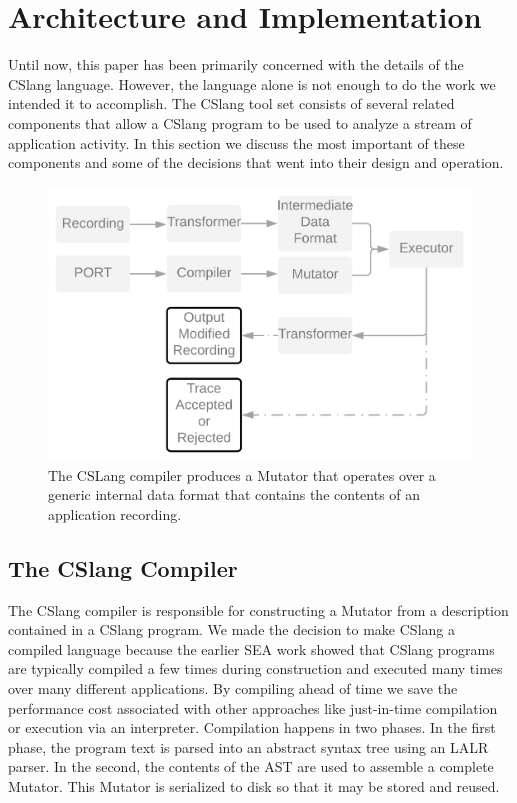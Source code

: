 \section{Architecture and Implementation}

Until now, this paper has been primarily concerned with the details of the
CSlang language.  However, the language alone is not enough to do the work
we intended it to accomplish.  The CSlang tool set
consists of several related
components that allow a CSlang program to be used to analyze a stream of
application activity.
In this section we discuss the most important of these components and some
of the decisions that went into their design and operation.

\label{SEC:architecture}

\begin{figure}
  \includegraphics[scale=.08]{images/architecture}
  \caption{The CSLang compiler produces a Mutator that operates over a
  generic internal data format that contains the contents of an application
  recording.}
  \label{fig:architecture}
\end{figure}

\subsection{The CSlang Compiler}

The CSlang compiler is responsible for constructing a Mutator
from a description contained in  a CSlang program.
We made the decision to make CSlang a compiled language because
the earlier SEA work showed that CSlang programs are typically
compiled a few times during construction
and executed many times over many different applications.
By compiling ahead of time we save the performance cost associated with other
approaches like just-in-time compilation or execution via an interpreter.
Compilation happens in two phases.  In the first phase, the program text is
parsed into an abstract syntax tree using an LALR parser.
In the second, the
contents of the AST are used to assemble a complete Mutator.
This Mutator is serialized to
disk so that it may be stored and reused.


